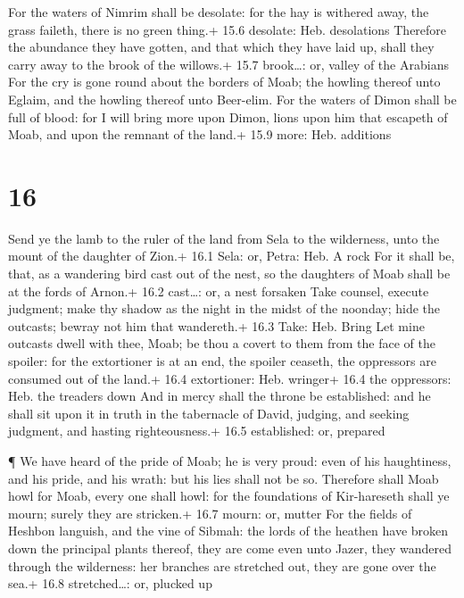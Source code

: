  For the waters of Nimrim shall be desolate: for the hay is
withered away, the grass faileth, there is no green thing.+ 15.6
desolate: Heb. desolations  Therefore the abundance they
have gotten, and that which they have laid up, shall they carry away to
the brook of the willows.+ 15.7 brook\ldots: or, valley of the Arabians
 For the cry is gone round about the borders of Moab; the
howling thereof unto Eglaim, and the howling thereof unto Beer-elim.
 For the waters of Dimon shall be full of blood: for I will
bring more upon Dimon, lions upon him that escapeth of Moab, and upon
the remnant of the land.+ 15.9 more: Heb. additions

\hypertarget{section-15}{%
\section{16}\label{section-15}}

 Send ye the lamb to the ruler of the land from Sela to the
wilderness, unto the mount of the daughter of Zion.+ 16.1 Sela: or,
Petra: Heb. A rock  For it shall be, that, as a wandering
bird cast out of the nest, so the daughters of Moab shall be at the
fords of Arnon.+ 16.2 cast\ldots: or, a nest forsaken  Take
counsel, execute judgment; make thy shadow as the night in the midst of
the noonday; hide the outcasts; bewray not him that wandereth.+ 16.3
Take: Heb. Bring  Let mine outcasts dwell with thee, Moab;
be thou a covert to them from the face of the spoiler: for the
extortioner is at an end, the spoiler ceaseth, the oppressors are
consumed out of the land.+ 16.4 extortioner: Heb. wringer+ 16.4 the
oppressors: Heb. the treaders down  And in mercy shall the
throne be established: and he shall sit upon it in truth in the
tabernacle of David, judging, and seeking judgment, and hasting
righteousness.+ 16.5 established: or, prepared

 ¶ We have heard of the pride of Moab; he is very proud:
even of his haughtiness, and his pride, and his wrath: but his lies
shall not be so.  Therefore shall Moab howl for Moab, every
one shall howl: for the foundations of Kir-hareseth shall ye mourn;
surely they are stricken.+ 16.7 mourn: or, mutter  For the
fields of Heshbon languish, and the vine of Sibmah: the lords of the
heathen have broken down the principal plants thereof, they are come
even unto Jazer, they wandered through the wilderness: her branches are
stretched out, they are gone over the sea.+ 16.8 stretched\ldots: or,
plucked up

